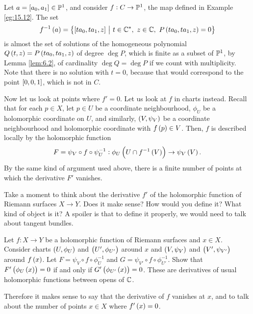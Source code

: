 \begin{example}
Let $ a = \sbr{a_0, a_1} \in \PP^1 $, and consider $ f : C \to \mathbb{P}^1 $, the map defined in Example \ref{eg:15.12}. The set
$$ f^{-1}\br{a} = \cbr{\sbr{ta_0, ta_1, z} \st t \in \CC^*, \ z \in \CC, \ P\br{ta_0, ta_1, z} = 0} $$
is almost the set of solutions of the homogeneous polynomial $ Q\br{t, z} = P\br{ta_0, ta_1, z} $ of degree $ \deg P $, which is finite as a subset of $ \mathbb{P}^1 $, by Lemma \ref{lem:6.2}, of cardinality $ \deg Q = \deg P $ if we count with multiplicity. Note that there is no solution with $ t = 0 $, because that would correspond to the point $ \sbr{0, 0, 1} $, which is not in $ C $.
\end{example}

Now let us look at points where $ f' = 0 $. Let us look at $ f $ in charts instead. Recall that for each $ p \in X $, let $ p \in U $ be a coordinate neighbourhood, $ \phi_U $ be a holomorphic coordinate on $ U $, and similarly, $ \br{V, \psi_V} $ be a coordinate neighbourhood and holomorphic coordinate with $ f\br{p} \in V $. Then, $ f $ is described locally by the holomorphic function
$$ F = \psi_V \circ f \circ \psi_U^{-1} : \phi_U\br{U \cap f^{-1}\br{V}} \to \psi_V\br{V}. $$
By the same kind of argument used above, there is a finite number of points at which the derivative $ F' $ vanishes.

\begin{exercise**}
Take a moment to think about the derivative $ f' $ of the holomorphic function of Riemann surfaces $ X \to Y $. Does it make sense? How would you define it? What kind of object is it? A spoiler is that to define it properly, we would need to talk about tangent bundles.
\end{exercise**}

\begin{exercise**}
Let $ f : X \to Y $ be a holomorphic function of Riemann surfaces and $ x \in X $. Consider charts $ \br{U, \phi_U} $ and $ \br{U', \phi_{U'}} $ around $ x $ and $ \br{V, \psi_V} $ and $ \br{V', \psi_{V'}} $ around $ f\br{x} $. Let $ F = \psi_V \circ f \circ \phi_U^{-1} $ and $ G = \psi_{V'} \circ f \circ \phi_{U'}^{-1} $. Show that $ F'\br{\phi_U\br{x}} = 0 $ if and only if $ G'\br{\phi_{U'}\br{x}} = 0 $. These are derivatives of usual holomorphic functions between opens of $ \mathbb{C} $.
\end{exercise**}

Therefore it makes sense to say that the derivative of $ f $ vanishes at $ x $, and to talk about the number of points $ x \in X $ where $ f'\br{x} = 0 $.

